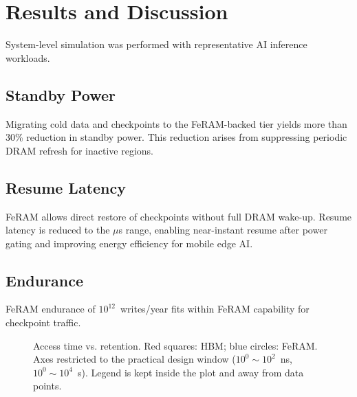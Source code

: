 \section{Results and Discussion}
System-level simulation was performed with representative AI inference workloads.

\subsection{Standby Power}
Migrating cold data and checkpoints to the FeRAM-backed tier yields more than 30\% reduction in standby power.
This reduction arises from suppressing periodic DRAM refresh for inactive regions.

\subsection{Resume Latency}
FeRAM allows direct restore of checkpoints without full DRAM wake-up.
Resume latency is reduced to the $\mu$s range, enabling near-instant resume after power gating and improving energy efficiency for mobile edge AI.

\subsection{Endurance}
FeRAM endurance of $10^{12}$~writes/year fits within FeRAM capability for checkpoint traffic.

\begin{figure}[!t]
\centering
{}
\caption{Access time vs. retention. Red squares: HBM; blue circles: FeRAM. Axes restricted to the practical design window ($10^0\!\sim\!10^2$~ns, $10^0\!\sim\!10^4$~s). Legend is kept inside the plot and away from data points.}
\label{fig:retention_vs_access}
\end{figure}
